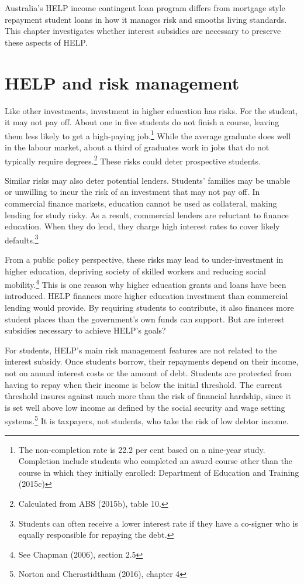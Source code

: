 \documentclass[]{book}
\begin{document}
Australia's HELP income contingent loan program differs from mortgage style repayment student loans in how it manages risk and smooths living standards. This chapter investigates whether interest subsidies are necessary to preserve these aspects of HELP.

\section{HELP and risk management}\label{help-and-risk-management}

Like other investments, investment in higher education has risks. For the student, it may not pay off. About one in five students do not finish a course, leaving them less likely to get a high-paying job.\footnote{The non-completion rate is 22.2 per cent based on a nine-year study. Completion include students who completed an award course other than the course in which they initially enrolled: Department of Education and Training (2015c)} While the average graduate does well in the labour market, about a third of graduates work in jobs that do not typically require degrees.\footnote{Calculated from ABS (2015b), table 10.} These risks could deter prospective students.

Similar risks may also deter potential lenders. Students' families may be unable or unwilling to incur the risk of an investment that may not pay off. In commercial finance markets, education cannot be used as collateral, making lending for study risky. As a result, commercial lenders are reluctant to finance education. When they do lend, they charge high interest rates to cover likely defaults.\footnote{Students can often receive a lower interest rate if they have a co-signer who is equally responsible for repaying the debt.}

From a public policy perspective, these risks may lead to under-investment in higher education, depriving society of skilled workers and reducing social mobility.\footnote{See Chapman (2006), section 2.5} This is one reason why higher education grants and loans have been introduced. HELP finances more higher education investment than commercial lending would provide. By requiring students to contribute, it also finances more student places than the government's own funds can support. But are interest subsidies necessary to achieve HELP's goals?

For students, HELP's main risk management features are not related to the interest subsidy. Once students borrow, their repayments depend on their income, not on annual interest costs or the amount of debt. Students are protected from having to repay when their income is below the initial threshold. The current threshold insures against much more than the risk of financial hardship, since it is set well above low income as defined by the social security and wage setting systems.\footnote{Norton and Cherastidtham (2016), chapter 4} It is taxpayers, not students, who take the risk of low debtor income.
\end{document}
